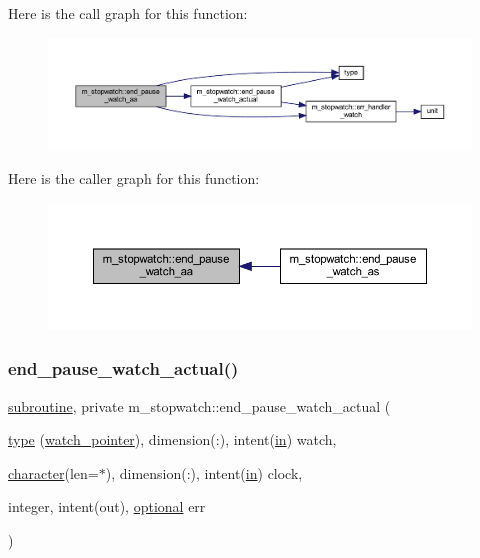 Here is the call graph for this function\+:
\nopagebreak
\begin{figure}[H]
\begin{center}
\leavevmode
\includegraphics[width=350pt]{namespacem__stopwatch_a435c9495ff60ec1dc27d4b41f4030582_cgraph}
\end{center}
\end{figure}
Here is the caller graph for this function\+:
\nopagebreak
\begin{figure}[H]
\begin{center}
\leavevmode
\includegraphics[width=350pt]{namespacem__stopwatch_a435c9495ff60ec1dc27d4b41f4030582_icgraph}
\end{center}
\end{figure}
\mbox{\label{namespacem__stopwatch_a8bbf8dd3f4d63f2047e8bbd51d998a16}} 
\subsubsection{\texorpdfstring{end\+\_\+pause\+\_\+watch\+\_\+actual()}{end\_pause\_watch\_actual()}}
{\footnotesize\ttfamily \hyperlink{M__stopwatch_83_8txt_acfbcff50169d691ff02d4a123ed70482}{subroutine}, private m\+\_\+stopwatch\+::end\+\_\+pause\+\_\+watch\+\_\+actual (\begin{DoxyParamCaption}\item[{\hyperlink{stop__watch_83_8txt_a70f0ead91c32e25323c03265aa302c1c}{type} (\hyperlink{structm__stopwatch_1_1watch__pointer}{watch\+\_\+pointer}), dimension(\+:), intent(\hyperlink{M__journal_83_8txt_afce72651d1eed785a2132bee863b2f38}{in})}]{watch,  }\item[{\hyperlink{option__stopwatch_83_8txt_abd4b21fbbd175834027b5224bfe97e66}{character}(len=$\ast$), dimension(\+:), intent(\hyperlink{M__journal_83_8txt_afce72651d1eed785a2132bee863b2f38}{in})}]{clock,  }\item[{integer, intent(out), \hyperlink{option__stopwatch_83_8txt_aa4ece75e7acf58a4843f70fe18c3ade5}{optional}}]{err }\end{DoxyParamCaption})\hspace{0.3cm}{\ttfamily [private]}}



